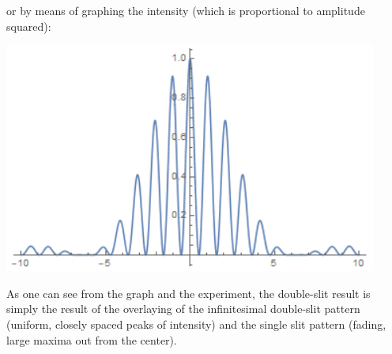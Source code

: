 or by means of graphing the intensity (which is proportional to amplitude squared): 
\begin{center}	
\includegraphics[scale=0.7]{images/waves/doubleslitwaveform.png}\\
\end{center}
As one can see from the graph and the experiment, the double-slit result is simply the result of the overlaying of the infinitesimal double-slit pattern (uniform, closely spaced peaks of intensity) and the single slit pattern (fading, large maxima out from the center). 